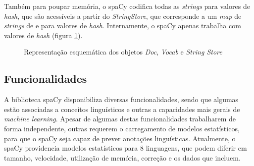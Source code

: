 \documentclass[12pt]{article}
\begin{document}
Também para poupar memória, o spaCy codifica todas as \textit{strings} para valores de \textit{hash}, que são acessíveis a partir do \textit{StringStore}, que corresponde a um \textit{map} de \textit{strings} de e para valores de \textit{hash}. Internamente, o spaCy apenas trabalha com valores de \textit{hash} (figura \ref{figure:doc-vocab-stringstore}).

\bigskip

\begin{figure}[!ht]
	\centering
	\setlength{\abovecaptionskip}{-.5cm}
	\caption{Representação esquemática dos objetos \textit{Doc}, \textit{Vocab} e \textit{String Store}}
	\label{figure:doc-vocab-stringstore}
\end{figure}




\subsection{Funcionalidades}

A biblioteca spaCy disponibiliza diversas funcionalidades, sendo que algumas estão associadas a conceitos linguísticos e outras a capacidades mais gerais de \textit{machine learning}. Apesar de algumas destas funcionalidades trabalharem de forma independente, outras requerem o carregamento de modelos estatísticos, para que o spaCy seja capaz de prever anotações linguísticas. Atualmente, o spaCy providencia modelos estatísticos para 8 linguagens, que podem diferir em tamanho, velocidade, utilização de memória, correção e os dados que incluem.
\end{document}
